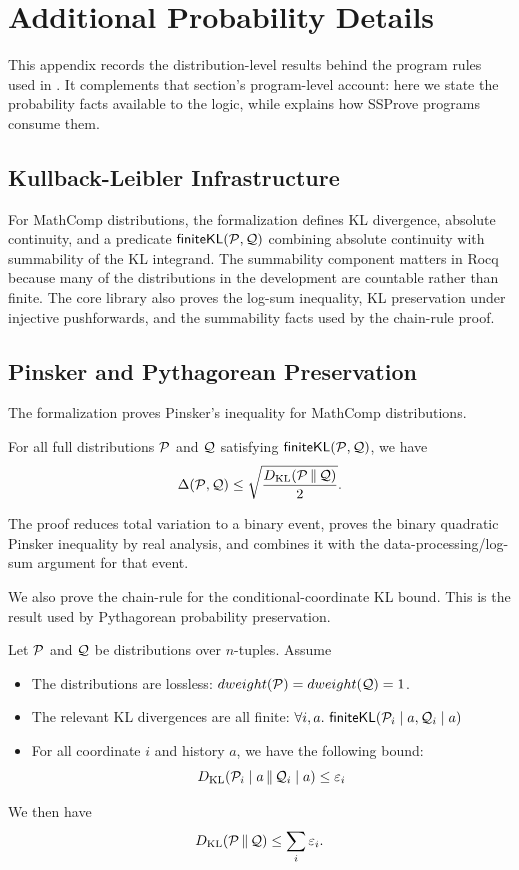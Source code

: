 \section{Additional Probability Details}
\label{sec:verified-kl-analysis}

This appendix records the distribution-level results behind the program rules
used in .
It complements that section's program-level account: here we state the
probability facts available to the logic, while  explains
how SSProve programs consume them.

\subsection{Kullback-Leibler Infrastructure}

For MathComp distributions, the formalization defines KL divergence, absolute
continuity, and a predicate \(\mathsf{finiteKL}(\mathcal{P},\mathcal{Q})\) combining absolute
continuity with summability of the KL integrand.
The summability component matters in Rocq because many of the distributions in the development are countable rather than finite.
The core library also proves the log-sum inequality, KL preservation under injective pushforwards, and the summability facts used by the chain-rule proof.

\subsection{Pinsker and Pythagorean Preservation}

The formalization proves Pinsker's inequality for MathComp distributions.
\begin{lemma}
    For all full distributions $\mathcal{P}$ and $\mathcal{Q}$ satisfying $\mathsf{finiteKL}(\mathcal{P},\mathcal{Q})$, we have
    \begin{equation}
        \Delta(\mathcal{P},\mathcal{Q})
  \leq
  \sqrt{\frac{D_{\mathrm{KL}}\!\left(\mathcal{P}\,\|\,\mathcal{Q}\right)}{2}}.
    \end{equation}
\end{lemma}
The proof reduces total variation to a binary event, proves the binary quadratic Pinsker inequality by real analysis, and combines it with the data-processing/log-sum argument for that event.

We also prove the chain-rule for the conditional-coordinate KL bound.
This is the result used by Pythagorean probability preservation.
\begin{lemma}
Let $\mathcal{P}$ and $\mathcal{Q}$ be distributions over $n$-tuples.
Assume
\begin{itemize}
    \item The distributions are lossless: $dweight(\mathcal{P})=dweight(\mathcal{Q})=1$.
    \item The relevant KL divergences are all finite:
    $\forall i,a.\ 
    \mathsf{finiteKL}(\cP_i\mid a,\cQ_i\mid a)$
    \item For all coordinate $i$ and history $a$, we have the following bound:
    $$D_{\mathrm{KL}}\!\left(\mathcal{P}_i\mid a\,\|\,\mathcal{Q}_i\mid a\right)\leq \varepsilon_i$$
\end{itemize}
We then have
\[
  D_{\mathrm{KL}}\!\left(\mathcal{P}\,\|\,\mathcal{Q}\right)\leq \sum_i \varepsilon_i .
\]
\end{lemma}

